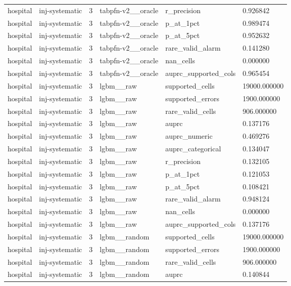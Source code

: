 \begin{tabular}{llllll}
hospital & inj-systematic & 3 & tabpfn-v2\_\_oracle & r\_precision & 0.926842 \\
hospital & inj-systematic & 3 & tabpfn-v2\_\_oracle & p\_at\_1pct & 0.989474 \\
hospital & inj-systematic & 3 & tabpfn-v2\_\_oracle & p\_at\_5pct & 0.952632 \\
hospital & inj-systematic & 3 & tabpfn-v2\_\_oracle & rare\_valid\_alarm & 0.141280 \\
hospital & inj-systematic & 3 & tabpfn-v2\_\_oracle & nan\_cells & 0.000000 \\
hospital & inj-systematic & 3 & tabpfn-v2\_\_oracle & auprc\_supported\_cols & 0.965454 \\
hospital & inj-systematic & 3 & lgbm\_\_raw & supported\_cells & 19000.000000 \\
hospital & inj-systematic & 3 & lgbm\_\_raw & supported\_errors & 1900.000000 \\
hospital & inj-systematic & 3 & lgbm\_\_raw & rare\_valid\_cells & 906.000000 \\
hospital & inj-systematic & 3 & lgbm\_\_raw & auprc & 0.137176 \\
hospital & inj-systematic & 3 & lgbm\_\_raw & auprc\_numeric & 0.469276 \\
hospital & inj-systematic & 3 & lgbm\_\_raw & auprc\_categorical & 0.134047 \\
hospital & inj-systematic & 3 & lgbm\_\_raw & r\_precision & 0.132105 \\
hospital & inj-systematic & 3 & lgbm\_\_raw & p\_at\_1pct & 0.121053 \\
hospital & inj-systematic & 3 & lgbm\_\_raw & p\_at\_5pct & 0.108421 \\
hospital & inj-systematic & 3 & lgbm\_\_raw & rare\_valid\_alarm & 0.948124 \\
hospital & inj-systematic & 3 & lgbm\_\_raw & nan\_cells & 0.000000 \\
hospital & inj-systematic & 3 & lgbm\_\_raw & auprc\_supported\_cols & 0.137176 \\
hospital & inj-systematic & 3 & lgbm\_\_random & supported\_cells & 19000.000000 \\
hospital & inj-systematic & 3 & lgbm\_\_random & supported\_errors & 1900.000000 \\
hospital & inj-systematic & 3 & lgbm\_\_random & rare\_valid\_cells & 906.000000 \\
hospital & inj-systematic & 3 & lgbm\_\_random & auprc & 0.140844 \\

\end{tabular}
